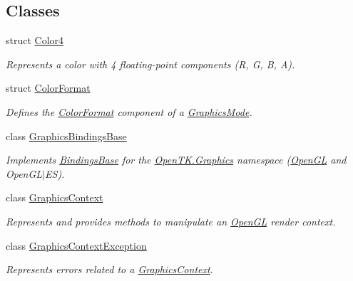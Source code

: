 \subsection*{Classes}
\begin{DoxyCompactItemize}
\item 
struct \hyperlink{struct_open_t_k_1_1_graphics_1_1_color4}{Color4}
\begin{DoxyCompactList}\small\item\em Represents a color with 4 floating-\/point components (R, G, B, A). \end{DoxyCompactList}\item 
struct \hyperlink{struct_open_t_k_1_1_graphics_1_1_color_format}{Color\-Format}
\begin{DoxyCompactList}\small\item\em Defines the \hyperlink{struct_open_t_k_1_1_graphics_1_1_color_format}{Color\-Format} component of a \hyperlink{class_open_t_k_1_1_graphics_1_1_graphics_mode}{Graphics\-Mode}.\end{DoxyCompactList}\item 
class \hyperlink{class_open_t_k_1_1_graphics_1_1_graphics_bindings_base}{Graphics\-Bindings\-Base}
\begin{DoxyCompactList}\small\item\em Implements \hyperlink{class_open_t_k_1_1_bindings_base}{Bindings\-Base} for the \hyperlink{namespace_open_t_k_1_1_graphics}{Open\-T\-K.\-Graphics} namespace (\hyperlink{namespace_open_t_k_1_1_graphics_1_1_open_g_l}{Open\-G\-L} and Open\-G\-L$|$\-E\-S). \end{DoxyCompactList}\item 
class \hyperlink{class_open_t_k_1_1_graphics_1_1_graphics_context}{Graphics\-Context}
\begin{DoxyCompactList}\small\item\em Represents and provides methods to manipulate an \hyperlink{namespace_open_t_k_1_1_graphics_1_1_open_g_l}{Open\-G\-L} render context. \end{DoxyCompactList}\item 
class \hyperlink{class_open_t_k_1_1_graphics_1_1_graphics_context_exception}{Graphics\-Context\-Exception}
\begin{DoxyCompactList}\small\item\em Represents errors related to a \hyperlink{class_open_t_k_1_1_graphics_1_1_graphics_context}{Graphics\-Context}. \end{DoxyCompactList}\item 

\end{DoxyCompactItemize}
